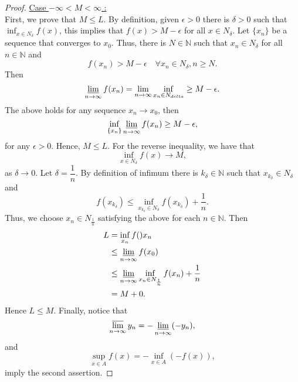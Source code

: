 \begin{proof}
        \underline{Case $ -\infty < M < \infty$ :} \\
        First, we prove that $M \leq L$. By definition, given $\epsilon>0$ there
        is $\delta >0$ such that $\inf_{x \in N_{\delta}} f(x)$, this implies 
        that
        $f(x) > M - \epsilon$ for all $x \in N_{\delta}$. Let $\{x_n\}$ be a 
        sequence
        that converges to $x_0$. Thus, there is $N \in \mathbb{N}$ such that 
        $x_n \in N_{\delta}$ for all $n \in \mathbb{N}$ and
        $$
            f(x_n) > M - \epsilon \quad \forall x_n \in N_{\delta}, n \geq N.
        $$
        Then
        $$
            \varliminf_{n \to \infty} f(x_n) = \lim_{n \to \infty} \inf_{x_n 
            \in N_{delta}} %
            \geq M - \epsilon.
        $$
        The above holds for any sequence $x_n \to x_0$, then
        $$
            \inf_{\{x_n\}} \varliminf_{n \to \infty} f(x_n) \geq M - \epsilon,
        $$
        for any $\epsilon > 0$. Hence, $M \leq L$.
        For the reverse inequality, we have that 
        $$
            \inf_{x \in N_{\delta}} f(x) \to M,
        $$
        as $\delta \to 0$. Let $\delta = \dfrac{1}{n}$. By definition of infimum
        there is $k_{\delta} \in \mathbb{N}$ such that $x_{k_{\delta}} \in 
        N_{\delta}$ and
        \begin{equation*}
            f(x_{k_\delta}) \leq \inf_{ x_{k_\delta} \in N_{\delta}} %
                f(x_{k_\delta}) + \dfrac{1}{n}.
        \end{equation*}
        Thus, we choose $x_n \in N_{\frac{1}{n}}$ satisfying the above for each
        $n \in  \mathbb{N}$. Then
        \begin{align*}
            L   &=      \inf_{x_n} f()x_n \\
                &\leq   \varliminf_{n \to \infty} f(x_0) \\
                &\leq   \varliminf_{n \to \infty} %
                            \inf_{x_n \in N_{\frac{1}{n}}} f(x_n) + 
                            \dfrac{1}{n}\\
                &= M + 0.
        \end{align*}
        Hence $L \leq M$. Finally, notice that
        $$
            \varlimsup_{n \to \infty} y_n = - \varliminf_{n \to \infty}(- y_n),
        $$
        and
        $$
            \sup_{x \in A} f(x) = - \inf_{x \in A}(- f(x)),
        $$
        imply the second assertion.
    \end{proof}
